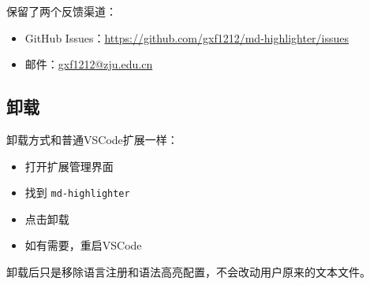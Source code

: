 保留了两个反馈渠道：
\begin{itemize}
    \item GitHub Issues：\url{https://github.com/gxf1212/md-highlighter/issues}
    \item 邮件：\href{mailto:gxf1212@zju.edu.cn}{gxf1212@zju.edu.cn}
\end{itemize}

\subsection{卸载}

卸载方式和普通VSCode扩展一样：
\begin{itemize}
    \item 打开扩展管理界面
    \item 找到 \lstinline|md-highlighter|
    \item 点击卸载
    \item 如有需要，重启VSCode
\end{itemize}

卸载后只是移除语言注册和语法高亮配置，不会改动用户原来的文本文件。
